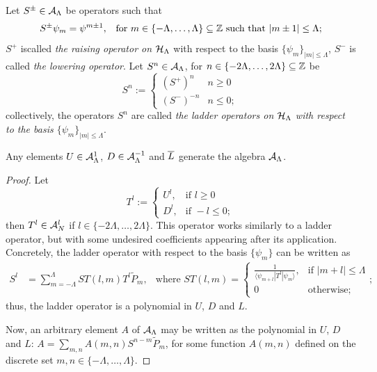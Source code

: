 \begin{definition}\label{definitionLadderOperatorsHLambda}
Let $S^\pm \in \mathcal A_{\Lambda}$ be operators such that
\begin{align}
    S^\pm \psi_m &= \psi^{m\pm 1}, & \text{for }m \in \{-\Lambda, \dots, \Lambda\} \subseteq \mathbb{Z} \text{ such that } |m \pm 1| \leq \Lambda;
\end{align}
$S^+$ iscalled \emph{the raising operator on $\mathcal H_\Lambda$} with respect to the basis $\{\psi_m\}_{|m| \leq \Lambda}$,  $S^-$ is called \emph{the lowering operator}. Let $S^n \in \mathcal A_\Lambda$, for $n \in \{-2\Lambda, \dots, 2\Lambda\} \subseteq \mathbb{Z}$ be
\begin{equation}
    S^n := \begin{cases}
    (S^+)^n & n \geq 0\\
    (S^-)^{-n} & n \leq 0;
    \end{cases}
\end{equation}
collectively, the operators $S^n$ are called \emph{the ladder operators on $\mathcal H_\Lambda$ with respect to the basis $\{\psi_m\}_{|m|\leq \Lambda}$}.
\end{definition}

\begin{lemma}\label{lemmaLUDScalarAngularMomentumGenerateD2}
Any elements $U \in \mathcal A^1_\Lambda$, $D \in \mathcal A^{-1}_\Lambda$ and $\overline{L}$ generate the algebra $\mathcal A_\Lambda$.
\end{lemma}
\begin{proof}
Let
\begin{equation*}
    T^l := 
    \begin{cases}
    U^l, &   \text{if } l \geq 0\\
    D^l, &   \text{if } -l \leq 0;
    \end{cases}
\end{equation*}
then $T^l \in \mathcal A_N^l$ if $l \in \{-2\Lambda, \dots, 2\Lambda\}$. This operator works similarly to a ladder operator, but with some undesired coefficients appearing after its application. Concretely, the ladder operator with respect to the basis $\{\psi_m\}$ can be written as
\begin{align}\label{equationFormulaGeneralLadderOperatorD2}
    S^l &= \sum_{m = -\Lambda}^\Lambda ST(l,m) T^l \tilde P_m, & \text{where }
    ST(l,m) =
        \begin{cases}
        \frac{1}{\langle \psi_{m+l}| T^l | \psi_{m}\rangle}, & \text{if } |m+l| \leq \Lambda\\
        0 & \text{otherwise;}
        \end{cases};
\end{align}
thus, the ladder operator is a polynomial in $U$, $D$ and $L$.

Now, an arbitrary element $A$ of $\mathcal A_\Lambda$ may be written as the polynomial in $U$, $D$ and $L$: $A =\sum_{m,n} A(m,n) S^{n-m} \tilde P_m$, for some function $A(m,n)$ defined on the discrete set $m,n \in \{-\Lambda, \dots, \Lambda\}$.
\end{proof}

